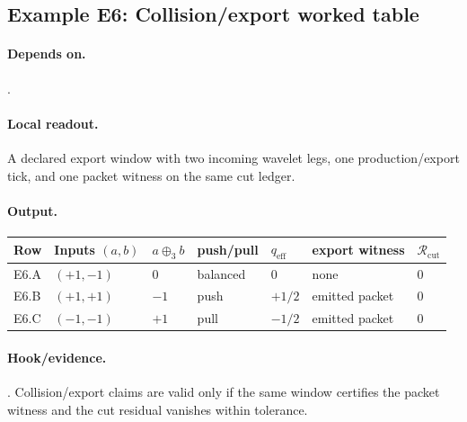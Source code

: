 \subsection{Example E6: Collision/export worked table}\label{ex:e6}
\paragraph{Depends on.} .
\paragraph{Local readout.} A declared export window with two incoming wavelet legs, one production/export tick, and one packet witness on the same cut ledger.
\paragraph{Output.}
{\footnotesize
\begin{center}
\begin{tabular}{@{}lllllll@{}}
\toprule
Row & Inputs $(a,b)$ & $a\oplus_3 b$ & push/pull & $q_{\mathrm{eff}}$ & export witness & $\mathcal R_{\mathrm{cut}}$ \\
\midrule
E6.A & $(+1,-1)$ & $0$ & balanced & $0$ & none & $0$ \\
E6.B & $(+1,+1)$ & $-1$ & push & $+1/2$ & emitted packet & $0$ \\
E6.C & $(-1,-1)$ & $+1$ & pull & $-1/2$ & emitted packet & $0$ \\
\bottomrule
\end{tabular}
\end{center}}
\paragraph{Hook/evidence.} . Collision/export claims are valid only if the same window certifies the packet witness and the cut residual vanishes within tolerance.

